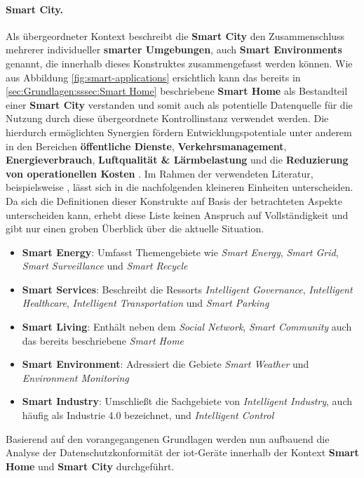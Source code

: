 \paragraph{Smart City.}
\label{sec:Grundlagen:para:Smart City}
Als übergeordneter Kontext beschreibt die \textbf{Smart City} den Zusammenschluss mehrerer individueller \textbf{smarter Umgebungen}, auch \textbf{Smart Environments} genannt, die innerhalb dieses Konstruktes zusammengefasst werden können. Wie aus Abbildung \ref{fig:smart-applications} ersichtlich kann das bereits in \ref{sec:Grundlagen:sssec:Smart Home} beschriebene \textbf{Smart Home} als Bestandteil einer \textbf{Smart City} verstanden und somit auch als potentielle Datenquelle für die Nutzung durch diese übergeordnete Kontrollinstanz verwendet werden. Die hierdurch ermöglichten Synergien fördern Entwicklungspotentiale unter anderem in den Bereichen \textbf{öffentliche Dienste}, \textbf{Verkehrsmanagement}, \textbf{Energieverbrauch}, \textbf{Luftqualität \& Lärmbelastung} und die \textbf{Reduzierung von operationellen Kosten} \cite{Bastos2018}.
Im Rahmen der verwendeten Literatur, beispielsweise \cite{Bastos2018,Cui2018,SecPrivSmartCity2021}, lässt sich in die nachfolgenden kleineren Einheiten unterscheiden. Da sich die Definitionen dieser Konstrukte auf Basis der betrachteten Aspekte unterscheiden kann, erhebt diese Liste keinen Anspruch auf Vollständigkeit und gibt nur einen groben Überblick über die aktuelle Situation.

\begin{itemize}
	\item \textbf{Smart Energy}: Umfasst Themengebiete wie \textit{Smart Energy}, \textit{Smart Grid}, \textit{Smart Surveillance} und \textit{Smart Recycle}
	\item \textbf{Smart Services}: Beschreibt die Ressorts \textit{Intelligent Governance}, \textit{Intelligent Healthcare}, \textit{Intelligent Transportation} und \textit{Smart Parking}
	\item \textbf{Smart Living}: Enthält neben dem \textit{Social Network}, \textit{Smart Community} auch das bereits beschriebene \textit{Smart Home}
	\item \textbf{Smart Environment}: Adressiert die Gebiete \textit{Smart Weather} und \textit{Environment Monitoring}
	\item \textbf{Smart Industry}: Umschließt die Sachgebiete von \textit{Intelligent Industry}, auch häufig als Industrie 4.0 bezeichnet, und \textit{Intelligent Control}
\end{itemize}

\noindent Basierend auf den vorangegangenen Grundlagen werden nun aufbauend die Analyse der Datenschutzkonformität der \ac{iot}-Geräte innerhalb der Kontext \textbf{Smart Home} und \textbf{Smart City} durchgeführt.
